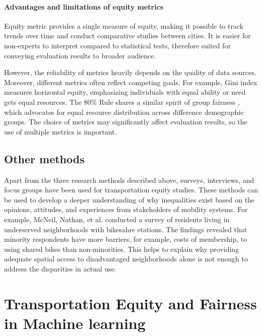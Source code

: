 \documentclass[11pt]{article}
\begin{document}
\paragraph{Advantages and limitations of equity metrics}
Equity metric provides a single measure of equity, making it possible to track trends over time and conduct comparative studies between cities. It is easier for non-experts to interpret compared to statistical tests, therefore suited for conveying evaluation results to broader audience.

However, the reliability of metrics heavily depends on the quality of data sources. Moreover, different metrics often reflect competing goals. For example, Gini index measures horizontal equity, emphasizing individuals with equal ability or need gets equal resources. The 80\% Rule shares a similar spirit of group fairness \cite{feldman2015certifying}, which advocates for equal resource distribution across difference demographic groups.  The choice of metrics may significantly affect evaluation results, so the use of multiple metrics is important.   

\subsection{Other methods}
Apart from the three research methods described above, surveys, interviews, and focus groups have been used for transportation equity studies. These methods can be used to develop a deeper understanding of why inequalities exist based on the opinions, attitudes, and experiences from stakeholders of mobility systems. For example, McNeil, Nathan, et al. \cite{mcneil2017breaking} conducted a survey of residents living in underserved neighborhoods with bikesahre stations. The findings revealed that minority respondents have more barriers, for example, costs of membership, to using shared bikes than non-minorities. This helps to explain why providing adequate spatial access to disadvantaged neighborhoods alone is not enough to address the disparities in actual use. 

\section{Transportation Equity and Fairness in Machine learning}
\end{document}
